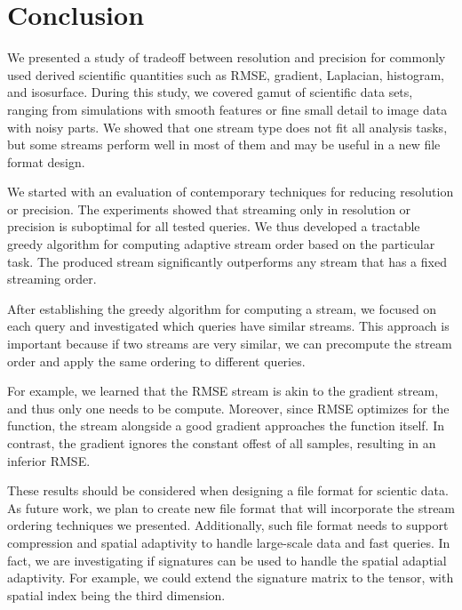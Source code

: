 \section{Conclusion}
We presented a study of tradeoff between resolution and precision for commonly used derived
scientific quantities such as RMSE, gradient, Laplacian, histogram, and isosurface.
During this study, we covered gamut of scientific data sets, ranging from simulations
with smooth features or fine small detail to image data with noisy parts.
We showed that one stream type does not fit all analysis tasks, but some streams perform well
in most of them and may be useful in a new file format design.





We started with an evaluation of contemporary techniques for reducing resolution or precision.
The experiments showed that streaming only in resolution or precision is suboptimal for all
tested queries. We thus developed a tractable greedy algorithm for computing adaptive stream order
based on the particular task. The produced stream significantly outperforms any stream that has
a fixed streaming order.

After establishing the greedy algorithm for computing a stream, we focused on each query and
investigated which queries have similar streams. This approach is important because if two streams
are very similar, we can precompute the stream order and apply the same ordering to different
queries.

For example, we learned that the RMSE stream is akin to the gradient stream, and thus only one
needs to be compute. Moreover, since RMSE optimizes for the function, the stream alongside
a good gradient approaches the function itself. In contrast, the gradient ignores the constant offest
of all samples, resulting in an inferior RMSE.


These results should be considered when designing a file format for scientic data. As future work,
we plan to create new file format that will incorporate the stream ordering techniques we presented.
Additionally, such file format needs to support compression and spatial adaptivity to handle large-scale
data and fast queries. In fact, we are investigating if signatures can be used to handle
the spatial adaptial adaptivity. For example, we could extend the signature matrix to the tensor, with
spatial index being the third dimension.


